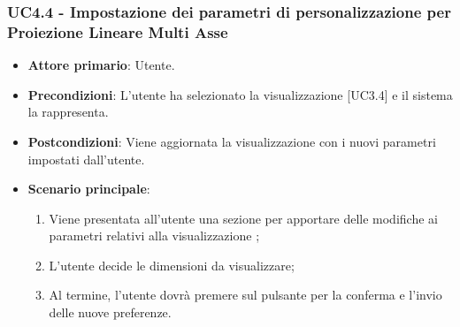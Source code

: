 \subsubsection{UC4.4 - Impostazione dei parametri di personalizzazione per Proiezione Lineare Multi Asse}
\begin{itemize}
	\item \textbf{Attore primario}: Utente.
	\item \textbf{Precondizioni}: L'utente ha selezionato la visualizzazione  [UC3.4] e il sistema la rappresenta.
	\item \textbf{Postcondizioni}: Viene aggiornata la visualizzazione  con i nuovi parametri impostati dall'utente.
	\item \textbf{Scenario principale}:
	\begin{enumerate}
			\item Viene presentata all'utente una sezione per apportare delle modifiche ai parametri relativi alla visualizzazione ;
			\item L'utente decide le dimensioni da visualizzare;
			\item Al termine, l'utente dovrà premere sul pulsante per la conferma e l'invio delle nuove preferenze.
		\end{enumerate}
\end{itemize}